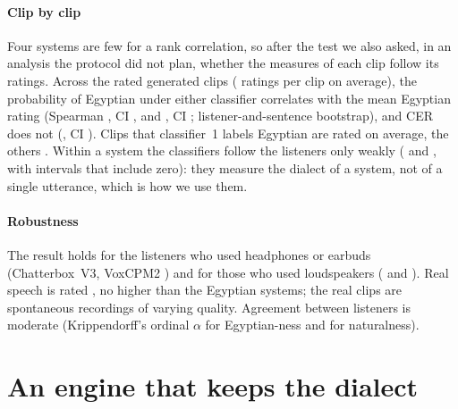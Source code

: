 \documentclass[11pt]{article}
\newcommand{\vox}{VoxCPM2\xspace}
\newcommand{\cbthree}{Chatterbox~V3\xspace}
\begin{document}
\paragraph{Clip by clip}
Four systems are few for a rank correlation, so after the test we also asked, in an analysis the protocol did not plan,
whether the measures of each clip follow its ratings. Across the  rated generated clips (
ratings per clip on average), the probability of Egyptian under either classifier correlates with the mean Egyptian
rating (Spearman , CI , and , CI ;
listener-and-sentence bootstrap), and CER does not (, CI ). Clips that
classifier~1 labels Egyptian are rated  on average, the others . Within a
system the classifiers follow the listeners only weakly ( and , with intervals that
include zero): they measure the dialect of a system, not of a single utterance, which is how we use them.

\paragraph{Robustness}
The result holds for the listeners who used
headphones or earbuds (\cbthree {}, \vox
{}) and for those who used loudspeakers (
and ). Real speech is rated , no higher than the Egyptian systems; the real clips are spontaneous
recordings of varying quality. Agreement between listeners is moderate (Krippendorff's ordinal $\alpha$
 for Egyptian-ness and  for naturalness).

\section{An engine that keeps the dialect}\label{sec:engine}

\begin{table}[t]
\centering\small
\begin{adjustbox}{max width=\textwidth}
\end{adjustbox}
\caption{Held-out Egyptian sentences over  seeds per utterance (mean and two-way bootstrap 95\% interval).
NAMAA is the best Egyptian fine-tune with permissive weights; \cbthree is the lowest-CER system of the bake-off.}
\label{tab:seeds}
\end{table}
\end{document}
